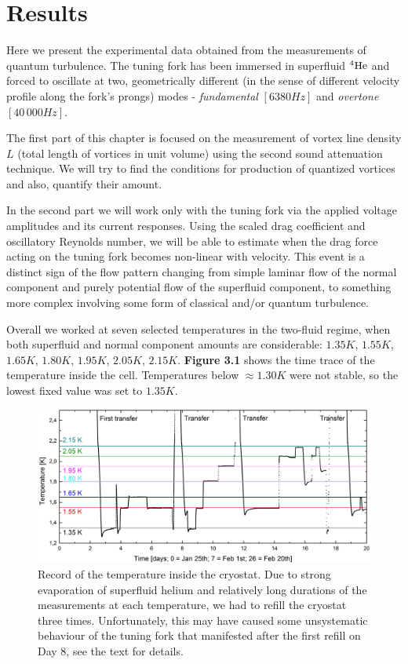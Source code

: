 \chapter{Results}

Here we present the experimental data obtained from the measurements of quantum turbulence. The tuning fork has been immersed in superfluid ${}^4\mathrm{He}$ and forced to oscillate at two, geometrically different (in the sense of different velocity profile along the fork's prongs) modes - \textit{fundamental} $ [6380\unit{Hz}] $ and \textit{overtone} $ [40\,000\unit{Hz}] $.

The first part of this chapter is focused on the measurement of vortex line density $ L $ (total length of vortices in unit volume) using the second sound attenuation technique. We will try to find the conditions for production of quantized vortices and also, quantify their amount.

In the second part we will work only with the tuning fork via the applied voltage amplitudes and its current responses. Using the scaled drag coefficient and oscillatory Reynolds number, we will be able to estimate when the drag force acting on the tuning fork becomes non-linear with velocity. This event is a distinct sign of the flow pattern changing from simple laminar flow of the normal component and purely potential flow of the superfluid component, to something more complex involving some form of classical and/or quantum turbulence.

Overall we worked at seven selected temperatures in the two-fluid regime, when both superfluid and normal component amounts are considerable: $ 1.35\unit{K} $, $ 1.55\unit{K} $, $ 1.65\unit{K} $, $ 1.80\unit{K} $, $ 1.95\unit{K} $, $ 2.05\unit{K} $, $ 2.15\unit{K} $.  {\sffamily\textbf{Figure 3.1}} shows the time trace of the temperature inside the cell. Temperatures below $\approx 1.30\unit{K} $ were not stable, so the lowest fixed value was set to $ 1.35\unit{K} $.


\begin{figure}[h!]
	\centering
	\includegraphics[width=1\textwidth]{graphs/diary}
	\caption{Record of the temperature inside the cryostat. Due to strong evaporation of superfluid helium and relatively long durations of the measurements at each temperature, we had to refill the cryostat three times. Unfortunately, this may have caused some unsystematic behaviour of the tuning fork that manifested after the first refill on Day 8, see the text for details.}
\end{figure}

